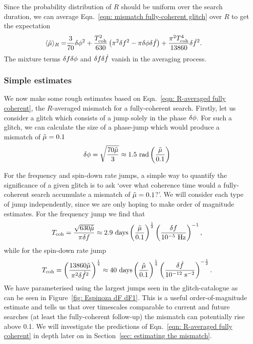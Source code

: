 \documentclass[../full_thesis/full_thesis.tex]{subfiles}
\begin{document}
Since the probability distribution of
$R$ should be uniform over the search duration, we can average Eqn.~\eqref{eqn:
mismatch fully-coherent glitch} over $R$ to get the expectation
\begin{align}
\langle \tilde{\mu} \rangle_{R} = &
\frac{3}{70}\delta\phi^{2}
+ \frac{T_{\mathrm{coh}}^{2}}{630}\left(\pi^{2}\delta f^{2}
- \pi\delta\phi\delta\dot{f}\right)
+ \frac{\pi^{2}T_{\mathrm{coh}}^{4}}{13860} \delta\dot{f}^{2}.
\label{eqn: R-averaged fully coherent}
\end{align}
The mixture terms $\delta f\delta\phi$ and
$\delta f\delta\dot{f}$ vanish in the averaging process.

\subsubsection{Simple estimates}

We now make some rough estimates based on Eqn.~\eqref{eqn: R-averaged
fully coherent}, the $R$-averaged mismatch for a fully-coherent search.
Firstly, let us consider a glitch which consists of a jump solely in the phase
$\delta\phi$. For such a glitch, we can calculate the size of a phase-jump
which would produce a mismatch of $\tilde{\mu}=0.1$
\begin{align}
\delta\phi =
\sqrt{\frac{70\tilde{\mu}}{3}} \approx 1.5 \textrm{ rad} \left(\frac{\tilde{\mu}}{0.1}\right)
\end{align}

For the frequency and spin-down rate jumps,
a simple way to quantify the significance of a given glitch is to ask `over
what coherence time would a fully-coherent search accumulate a mismatch of
$\tilde{\mu}=0.1$?'. We will consider each type of jump independently, since we are
only hoping to make order of magnitude estimates.
For the frequency jump we find that
\begin{align}
T_\textrm{coh} = \frac{\sqrt{630 \tilde{\mu}}}{\pi\delta f}
\approx 2.9 \textrm{ days} \left(\frac{\tilde{\mu}}{0.1}\right)^{\frac{1}{2}}
\left(\frac{\delta f}{10^{-5} \textrm{ Hz}}\right)^{-1},
\end{align}
while for the spin-down rate jump
\begin{align}
T_\textrm{coh} =
\left(\frac{13860 \tilde{\mu}}{\pi^{2}\delta\dot{f}^{2}}\right)^{\frac{1}{4}}
\approx 40 \textrm{ days} \left(\frac{\tilde{\mu}}{0.1}\right)^{\frac{1}{4}}
\left(\frac{\delta\dot{f}}{10^{-12} \textrm{ s}^{-2}}\right)^{-\frac{1}{2}}.
\end{align}
We have parameterised using the largest jumps seen in the glitch-catalogue as
can be seen in Figure~\ref{fig: Espinoza dF dF1}. This is a useful
order-of-magnitude estimate and tells us that over timescales comparable to
current and future searches (at least the fully-coherent follow-up) the
mismatch can potentially rise above 0.1.  We will investigate the predictions
of Eqn.~\eqref{eqn: R-averaged fully coherent} in depth later on in
Section~\ref{sec: estimating the mismatch}.
\end{document}
